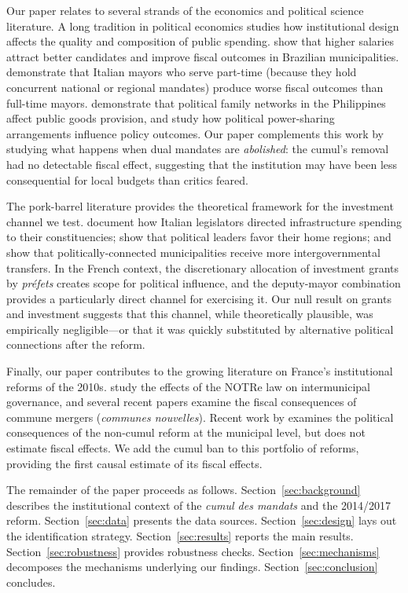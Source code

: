 \documentclass[12pt]{article}
\begin{document}
Our paper relates to several strands of the economics and political science literature. A long tradition in political economics studies how institutional design affects the quality and composition of public spending. \citet{ferraz2011finan} show that higher salaries attract better candidates and improve fiscal outcomes in Brazilian municipalities. \citet{gagliarducci2013manyfacespower} demonstrate that Italian mayors who serve part-time (because they hold concurrent national or regional mandates) produce worse fiscal outcomes than full-time mayors. \citet{cruz2017politician} demonstrate that political family networks in the Philippines affect public goods provision, and \citet{fiva2018power} study how political power-sharing arrangements influence policy outcomes. Our paper complements this work by studying what happens when dual mandates are \textit{abolished}: the cumul's removal had no detectable fiscal effect, suggesting that the institution may have been less consequential for local budgets than critics feared.

The pork-barrel literature provides the theoretical framework for the investment channel we test. \citet{golden2005pork} document how Italian legislators directed infrastructure spending to their constituencies; \citet{hodler2014regional} show that political leaders favor their home regions; and \citet{enikolopov2014politics} show that politically-connected municipalities receive more intergovernmental transfers. In the French context, the discretionary allocation of investment grants by \textit{préfets} creates scope for political influence, and the deputy-mayor combination provides a particularly direct channel for exercising it. Our null result on grants and investment suggests that this channel, while theoretically plausible, was empirically negligible---or that it was quickly substituted by alternative political connections after the reform.

Finally, our paper contributes to the growing literature on France's institutional reforms of the 2010s. \citet{breuille2018reform} study the effects of the NOTRe law on intermunicipal governance, and several recent papers examine the fiscal consequences of commune mergers (\textit{communes nouvelles}). Recent work by \citet{dewoolfson2019noncumul} examines the political consequences of the non-cumul reform at the municipal level, but does not estimate fiscal effects. We add the cumul ban to this portfolio of reforms, providing the first causal estimate of its fiscal effects.

The remainder of the paper proceeds as follows. Section~\ref{sec:background} describes the institutional context of the \textit{cumul des mandats} and the 2014/2017 reform. Section~\ref{sec:data} presents the data sources. Section~\ref{sec:design} lays out the identification strategy. Section~\ref{sec:results} reports the main results. Section~\ref{sec:robustness} provides robustness checks. Section~\ref{sec:mechanisms} decomposes the mechanisms underlying our findings. Section~\ref{sec:conclusion} concludes.
\end{document}

